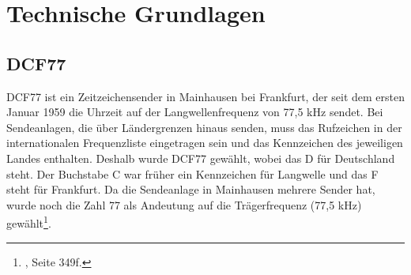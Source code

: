 \section{Technische Grundlagen}
\subsection{DCF77}\label{sec_dcfgrund}
DCF77 ist ein Zeitzeichensender in Mainhausen bei Frankfurt, der seit dem ersten Januar 1959 die Uhrzeit auf der Langwellenfrequenz von 77,5 kHz sendet. Bei Sendeanlagen, die über Ländergrenzen hinaus senden, muss das Rufzeichen in der internationalen Frequenzliste eingetragen sein und das Kennzeichen des jeweiligen Landes enthalten. Deshalb wurde DCF77 gewählt, wobei das D für Deutschland steht. Der Buchstabe C war früher ein Kennzeichen für Langwelle und das F steht für Frankfurt. Da die Sendeanlage in Mainhausen mehrere Sender hat, wurde noch die Zahl 77 als Andeutung auf die Trägerfrequenz (77,5 kHz) gewählt\footnote{\cite{dcf77}, Seite 349f.}.


